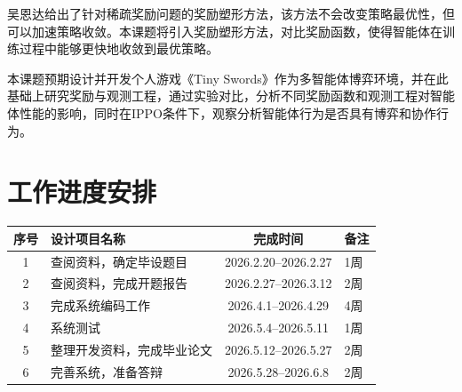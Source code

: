 \documentclass[12pt,a4paper,UTF8]{ctexart}
\numberwithin{equation}{section}
\begin{document}
吴恩达\cite{Ng1999PolicyIU}给出了针对稀疏奖励问题的奖励塑形方法，该方法不会改变策略最优性，但可以加速策略收敛。本课题将引入奖励塑形方法，对比奖励函数，使得智能体在训练过程中能够更快地收敛到最优策略。

本课题预期设计并开发个人游戏《Tiny Swords》作为多智能体博弈环境，并在此基础上研究奖励与观测工程，通过实验对比，分析不同奖励函数和观测工程对智能体性能的影响，同时在IPPO条件下，观察分析智能体行为是否具有博弈和协作行为。


\section{工作进度安排}

\begin{table}[H]
    \centering
    \renewcommand{\arraystretch}{1.3}
    \begin{tabularx}{\textwidth}{|c|X|c|p{2cm}|}
        \hline
        \textbf{序号} & \textbf{设计项目名称} & \textbf{完成时间} & \textbf{备注} \\
        \hline
        1 & 查阅资料，确定毕设题目 & 2026.2.20--2026.2.27 & 1周 \\
        \hline
        2 & 查阅资料，完成开题报告   & 2026.2.27--2026.3.12 & 2周 \\
        \hline
        3 & 完成系统编码工作         & 2026.4.1--2026.4.29   & 4周 \\
        \hline
        4 & 系统测试                 & 2026.5.4--2026.5.11   & 1周 \\
        \hline
        5 & 整理开发资料，完成毕业论文 & 2026.5.12--2026.5.27  & 2周 \\
        \hline
        6 & 完善系统，准备答辩       & 2026.5.28--2026.6.8   & 2周 \\
        \hline
    \end{tabularx}
\end{table}

\begin{wuhao}
    
\end{wuhao}

\end{document}
